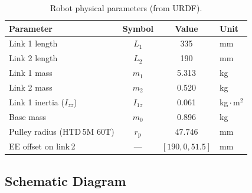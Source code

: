 \documentclass[11pt,a4paper]{article}
\newcommand{\rp}{r_{\mathrm{p}}}
\begin{document}
\begin{table}[h]
\centering
\caption{Robot physical parameters (from URDF).}
\begin{tabular}{lccl}
\toprule
\textbf{Parameter} & \textbf{Symbol} & \textbf{Value} & \textbf{Unit} \\
\midrule
Link 1 length       & $L_1$  & 335   & mm \\
Link 2 length       & $L_2$  & 190   & mm \\
Link 1 mass          & $m_1$  & 5.313 & kg \\
Link 2 mass          & $m_2$  & 0.520 & kg \\
Link 1 inertia ($I_{zz}$) & $I_{1z}$ & 0.061 & kg\,$\cdot$\,m$^2$ \\
Base mass            & $m_0$  & 0.896 & kg \\
Pulley radius (HTD\,5M 60T) & $\rp$ & 47.746 & mm \\
EE offset on link\,2 & --- & $[190, 0, 51.5]$ & mm \\
\bottomrule
\end{tabular}
\label{tab:params}
\end{table}

\subsection{Schematic Diagram}
\end{document}
